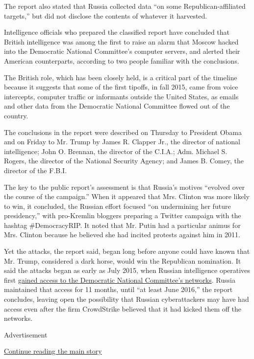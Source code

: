 The report also stated that Russia collected data ``on some
Republican-affiliated targets,'' but did not disclose the contents of
whatever it harvested.

Intelligence officials who prepared the classified report have concluded
that British intelligence was among the first to raise an alarm that
Moscow hacked into the Democratic National Committee's computer servers,
and alerted their American counterparts, according to two people
familiar with the conclusions.

The British role, which has been closely held, is a critical part of the
timeline because it suggests that some of the first tipoffs, in fall
2015, came from voice intercepts, computer traffic or informants outside
the United States, as emails and other data from the Democratic National
Committee flowed out of the country.

The conclusions in the report were described on Thursday to President
Obama and on Friday to Mr. Trump by James R. Clapper Jr., the director
of national intelligence; John O. Brennan, the director of the C.I.A.;
Adm. Michael S. Rogers, the director of the National Security Agency;
and James B. Comey, the director of the F.B.I.

The key to the public report's assessment is that Russia's motives
``evolved over the course of the campaign.'' When it appeared that Mrs.
Clinton was more likely to win, it concluded, the Russian effort focused
``on undermining her future presidency,'' with pro-Kremlin bloggers
preparing a Twitter campaign with the hashtag \#DemocracyRIP. It noted
that Mr. Putin had a particular animus for Mrs. Clinton because he
believed she had incited protests against him in 2011.

Yet the attacks, the report said, began long before anyone could have
known that Mr. Trump, considered a dark horse, would win the Republican
nomination. It said the attacks began as early as July 2015, when
Russian intelligence operatives first
\href{https://www.nytimes3xbfgragh.onion/2016/12/13/us/politics/russia-hack-election-dnc.html}{gained
access to the Democratic National Committee's networks}. Russia
maintained that access for 11 months, until ``at least June 2016,'' the
report concludes, leaving open the possibility that Russian
cyberattackers may have had access even after the firm CrowdStrike
believed that it had kicked them off the networks.

Advertisement

\protect\hyperlink{after-bottom}{Continue reading the main story}

